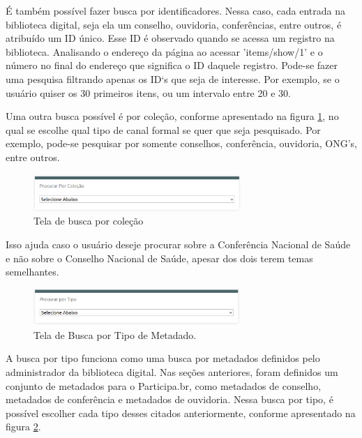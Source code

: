 É também possível fazer busca por identificadores. Nessa caso, cada entrada na biblioteca digital, seja ela um conselho, ouvidoria, conferências, entre outros, é atribuído um ID único. Esse ID é observado quando se acessa um registro na biblioteca. Analisando o endereço da página ao acessar 'items/show/1' e o número no final do endereço que significa o ID daquele registro. Pode-se fazer uma pesquisa filtrando apenas os ID`s que seja de interesse. Por exemplo, se o usuário quiser os 30 primeiros itens, ou um intervalo entre 20 e 30.

Uma outra busca possível é por coleção, conforme apresentado na figura \ref{fig:buscacolecao_prototipo}, no qual se escolhe qual tipo de canal formal se quer que seja pesquisado. Por exemplo, pode-se pesquisar por somente conselhos, conferência, ouvidoria, ONG’s, entre outros.

\graphicspath{{figuras/prototipo/}}
\begin{figure}[H]
\centering
\includegraphics[width=0.7\textwidth]{busca-colecao}
\caption{Tela de busca por coleção}
\label{fig:buscacolecao_prototipo}
\end{figure}

Isso ajuda caso o usuário deseje procurar sobre a Conferência Nacional de Saúde e não sobre o Conselho Nacional de Saúde, apesar dos dois terem temas semelhantes.

\graphicspath{{figuras/prototipo/}}
\begin{figure}[H]
\centering
\includegraphics[width=0.7\textwidth]{busca-tipo-metadado}
\caption{Tela de Busca por Tipo de Metadado.}
\label{fig:buscatipometadado_prototipo}
\end{figure}

A busca por tipo funciona como uma busca por metadados definidos pelo administrador da biblioteca digital. Nas seções anteriores, foram definidos um conjunto de metadados para o Participa.br, como metadados de conselho, metadados de conferência e metadados de ouvidoria. Nessa busca por tipo, é possível escolher cada tipo desses citados anteriormente, conforme apresentado na figura \ref{fig:buscatipometadado_prototipo}.


